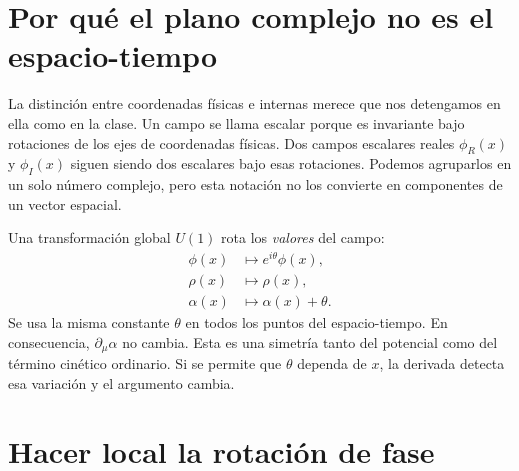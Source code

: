 \begin{classroomqa}
\end{classroomqa}

\section{Por qué el plano complejo no es el espacio-tiempo}

La distinción entre coordenadas físicas e internas merece que nos detengamos en ella como en la clase. Un campo se llama escalar porque es invariante bajo rotaciones de los ejes de coordenadas físicas. Dos campos escalares reales \(\phi_R(x)\) y \(\phi_I(x)\) siguen siendo dos escalares bajo esas rotaciones. Podemos agruparlos en un solo número complejo, pero esta notación no los convierte en componentes de un vector espacial.

Una transformación global \(U(1)\) rota los \emph{valores} del campo:
\begin{equation}
\begin{aligned}
  \phi(x)&\longmapsto e^{i\theta}\phi(x),
  \\
  \rho(x)&\longmapsto\rho(x),
  \\
  \alpha(x)&\longmapsto\alpha(x)+\theta.
\end{aligned}
  \label{eq:l08-global-shift}
\end{equation}
Se usa la misma constante \(\theta\) en todos los puntos del espacio-tiempo. En consecuencia, \(\partial_\mu\alpha\) no cambia. Esta es una simetría tanto del potencial como del término cinético ordinario. Si se permite que \(\theta\) dependa de \(x\), la derivada detecta esa variación y el argumento cambia.

\section{Hacer local la rotación de fase}

